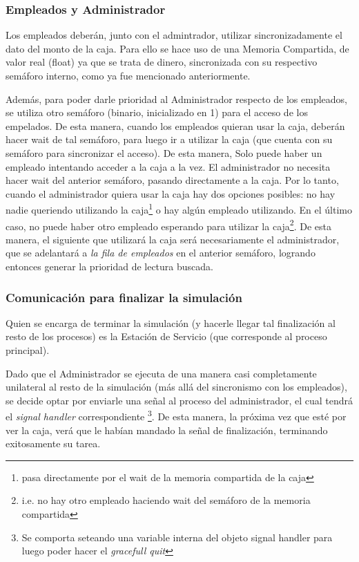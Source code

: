\documentclass[a4paper,12pt]{article}
\begin{document}
\subsubsection{Empleados y Administrador}
Los empleados deberán, junto con el admintrador, utilizar sincronizadamente el dato del monto de la caja. Para ello se hace uso de una Memoria Compartida, de valor real (float) ya que se trata de dinero, sincronizada con su respectivo semáforo interno, como ya fue mencionado anteriormente.

Además, para poder darle prioridad al Administrador respecto de los empleados, se utiliza otro semáforo (binario, inicializado en 1) para el acceso de los empelados. De esta manera, cuando los empleados quieran usar la caja, deberán hacer wait de tal semáforo, para luego ir a utilizar la caja (que cuenta con su semáforo para sincronizar el acceso). De esta manera, Solo puede haber un empleado intentando acceder a la caja a la vez. El administrador no necesita hacer wait del anterior semáforo, pasando directamente a la caja. Por lo tanto, cuando el administrador quiera usar la caja hay dos opciones posibles: no hay nadie queriendo utilizando la caja\footnote{pasa directamente por el wait de la memoria compartida de la caja} o hay algún empleado utilizando. En el último caso, no puede haber otro empleado esperando para utilizar la caja\footnote{i.e. no hay otro empleado haciendo wait del semáforo de la memoria compartida}. De esta manera, el siguiente que utilizará la caja será necesariamente el administrador, que se adelantará a \textit{la fila de empleados} en el anterior semáforo, logrando entonces generar la prioridad de lectura buscada.

\subsubsection{Comunicación para finalizar la simulación}
Quien se encarga de terminar la simulación (y hacerle llegar tal finalización al resto de los procesos) es la Estación de Servicio (que corresponde al proceso principal).

Dado que el Administrador se ejecuta de una manera casi completamente unilateral al resto de la simulación (más allá del sincronismo con los empleados), se decide optar por enviarle una señal al proceso del administrador, el cual tendrá el \textit{signal handler} correspondiente \footnote{Se comporta seteando una variable interna del objeto signal handler para luego poder hacer el \textit{gracefull quit}}. De esta manera, la próxima vez que esté por ver la caja, verá que le habían mandado la señal de finalización, terminando exitosamente su tarea.
\end{document}
